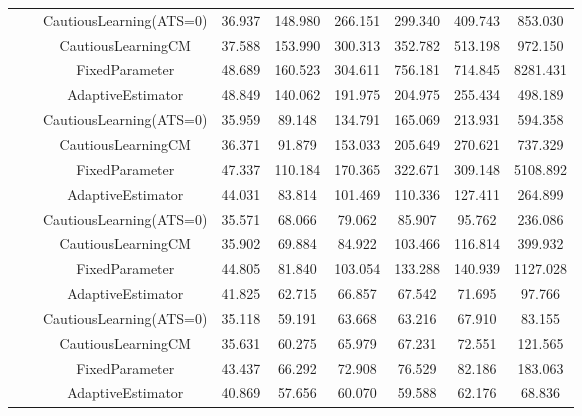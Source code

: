\begin{table}[!h]
\begin{tabular}[t]{ccccccccc}
 &  & CautiousLearning(ATS=0) & 36.937 & 148.980 & 266.151 & 299.340 & 409.743 & 853.030\\

 &  & CautiousLearningCM & 37.588 & 153.990 & 300.313 & 352.782 & 513.198 & 972.150\\

 & \multirow[t]{-4}{*}{\centering\arraybackslash 0.25} & FixedParameter & 48.689 & 160.523 & 304.611 & 756.181 & 714.845 & 8281.431\\
\cmidrule{2-9}
 &  & AdaptiveEstimator & 48.849 & 140.062 & 191.975 & 204.975 & 255.434 & 498.189\\

 &  & CautiousLearning(ATS=0) & 35.959 & 89.148 & 134.791 & 165.069 & 213.931 & 594.358\\

 &  & CautiousLearningCM & 36.371 & 91.879 & 153.033 & 205.649 & 270.621 & 737.329\\

 & \multirow[t]{-4}{*}{\centering\arraybackslash 0.35} & FixedParameter & 47.337 & 110.184 & 170.365 & 322.671 & 309.148 & 5108.892\\
\cmidrule{2-9}
 &  & AdaptiveEstimator & 44.031 & 83.814 & 101.469 & 110.336 & 127.411 & 264.899\\

 &  & CautiousLearning(ATS=0) & 35.571 & 68.066 & 79.062 & 85.907 & 95.762 & 236.086\\

 &  & CautiousLearningCM & 35.902 & 69.884 & 84.922 & 103.466 & 116.814 & 399.932\\

 & \multirow[t]{-4}{*}{\centering\arraybackslash 0.50} & FixedParameter & 44.805 & 81.840 & 103.054 & 133.288 & 140.939 & 1127.028\\
\cmidrule{2-9}
 &  & AdaptiveEstimator & 41.825 & 62.715 & 66.857 & 67.542 & 71.695 & 97.766\\

 &  & CautiousLearning(ATS=0) & 35.118 & 59.191 & 63.668 & 63.216 & 67.910 & 83.155\\

 &  & CautiousLearningCM & 35.631 & 60.275 & 65.979 & 67.231 & 72.551 & 121.565\\

 & \multirow[t]{-4}{*}{\centering\arraybackslash 0.75} & FixedParameter & 43.437 & 66.292 & 72.908 & 76.529 & 82.186 & 183.063\\
\cmidrule{2-9}
 &  & AdaptiveEstimator & 40.869 & 57.656 & 60.070 & 59.588 & 62.176 & 68.836\\


\end{tabular}
\end{table}
